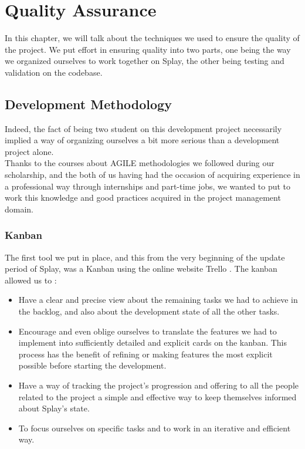 \documentclass{eplmastersthesis}
\begin{document}
  \chapter{Quality Assurance}

    In this chapter, we will talk about the techniques we used to ensure the
    quality of the project. We put effort in ensuring quality into two
    parts, one being the way we organized ourselves to work together on Splay,
    the other being testing and validation on the codebase.

    \section{Development Methodology}

      Indeed, the fact of being two student on this development project necessarily
      implied a way of organizing ourselves a bit more serious than a
      development project alone.\\

      Thanks to the courses about AGILE methodologies we followed during our
      scholarship, and the both of us having had the occasion of acquiring
      experience in a professional way through internships and part-time jobs,
      we wanted to put to work this knowledge and good practices acquired in
      the project management domain.

        \subsection{Kanban}

          The first tool we put in place, and this from the very beginning of
          the update period of Splay, was a Kanban using the online website
          Trello \cite{trello}. The kanban allowed us to : \\

          \begin{itemize}
            \item Have a clear and precise view about the remaining tasks we had
            to achieve in the backlog, and also about the development state of
            all the other tasks.
            \item Encourage and even oblige ourselves to translate the features
            we had to implement into sufficiently detailed and explicit cards on
            the kanban. This process has the benefit of refining or making
            features the most explicit possible before starting the development.
            \item Have a way of tracking the project's progression and offering
            to all the people related to the project a simple and effective way
            to keep themselves informed about Splay's state.
            \item To focus ourselves on specific tasks and to work in an
            iterative and efficient way.
          \end{itemize}
\end{document}
